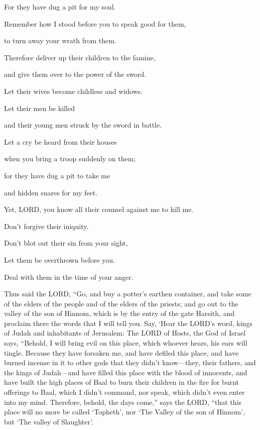 For they have dug a pit for my soul.

Remember how I stood before you to speak good for them,

to turn away your wrath from them.


\myverse{}Therefore deliver up their children to the famine,

and give them over to the power of the sword.

Let their wives become childless and widows.

Let their men be killed

and their young men struck by the sword in battle.


\myverse{}Let a cry be heard from their houses

when you bring a troop suddenly on them;

for they have dug a pit to take me

and hidden snares for my feet.


\myverse{}Yet, LORD, you know all their counsel against me to kill me.

Don’t forgive their iniquity.

Don’t blot out their sin from your sight,

Let them be overthrown before you.

Deal with them in the time of your anger.


\mychapter{} \myverse*{}Thus said the LORD, “Go, and buy a potter’s earthen container,
and take some of the elders of the people and of the elders of the priests; \myverse{}and go out to the valley of the son of Hinnom, which is by the entry of the gate Harsith, and proclaim there the words that I will tell you. \myverse{}Say, ‘Hear the LORD’s word, kings of Judah and inhabitants of Jerusalem: The LORD of Hosts, the God of Israel says, “Behold, I will bring evil on this place, which whoever hears, his ears will tingle. \myverse{}Because they have forsaken me, and have defiled this place, and have burned incense in it to other gods that they didn’t know—they, their fathers, and the kings of Judah—and have filled this place with the blood of innocents, \myverse{}and have built the high places of Baal to burn their children in the fire for burnt offerings to Baal, which I didn’t command, nor speak, which didn’t even enter into my mind. \myverse{}Therefore, behold, the days come,” says the LORD, “that this place will no more be called ‘Topheth’, nor ‘The Valley of the son of Hinnom’, but ‘The valley of Slaughter’.


